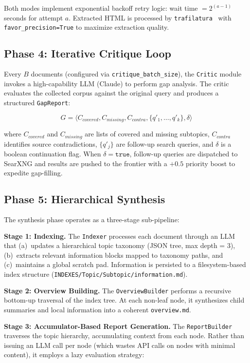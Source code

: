 \documentclass[conference]{IEEEtran}
\begin{document}
Both modes implement exponential backoff retry logic: wait time $= 2^{(a-1)}$ seconds for attempt $a$. Extracted HTML is processed by \texttt{trafilatura}~\cite{barbaresi2021trafilatura} with \texttt{favor\_precision=True} to maximize extraction quality.

\subsection{Phase 4: Iterative Critique Loop}

Every $B$ documents (configured via \texttt{critique\_batch\_size}), the \texttt{Critic} module invokes a high-capability LLM (Claude) to perform gap analysis. The critic evaluates the collected corpus against the original query and produces a structured \texttt{GapReport}:

\begin{equation}
G = \langle C_{covered}, C_{missing}, C_{contra}, \{q'_1, \ldots, q'_k\}, \delta \rangle
\end{equation}

where $C_{covered}$ and $C_{missing}$ are lists of covered and missing subtopics, $C_{contra}$ identifies source contradictions, $\{q'_j\}$ are follow-up search queries, and $\delta$ is a boolean continuation flag. When $\delta = \texttt{true}$, follow-up queries are dispatched to SearXNG and results are pushed to the frontier with a $+0.5$ priority boost to expedite gap-filling.

\subsection{Phase 5: Hierarchical Synthesis}

The synthesis phase operates as a three-stage sub-pipeline:

\textbf{Stage 1: Indexing.} The \texttt{Indexer} processes each document through an LLM that (a)~updates a hierarchical topic taxonomy (JSON tree, max depth = 3), (b)~extracts relevant information blocks mapped to taxonomy paths, and (c)~maintains a global scratch pad. Information is persisted to a filesystem-based index structure (\texttt{INDEXES/Topic/Subtopic/information.md}).

\textbf{Stage 2: Overview Building.} The \texttt{OverviewBuilder} performs a recursive bottom-up traversal of the index tree. At each non-leaf node, it synthesizes child summaries and local information into a coherent \texttt{overview.md}.

\textbf{Stage 3: Accumulator-Based Report Generation.} The \texttt{ReportBuilder} traverses the topic hierarchy, accumulating context from each node. Rather than issuing an LLM call per node (which wastes API calls on nodes with minimal content), it employs a lazy evaluation strategy:
\end{document}
